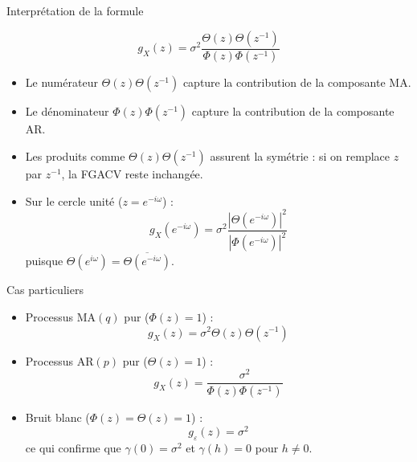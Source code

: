 \documentclass[11pt,aspectratio=169]{beamer}
\begin{document}
\begin{frame}{Interprétation de la formule}

\[
g_X(z) = \sigma^2 \frac{\Theta(z)\Theta(z^{-1})}{\Phi(z)\Phi(z^{-1})}
\]

\begin{itemize}

\item Le numérateur $\Theta(z)\Theta(z^{-1})$ capture la contribution de la composante MA.\newline

\item Le dénominateur $\Phi(z)\Phi(z^{-1})$ capture la contribution de la composante AR.\newline

\item Les produits comme $\Theta(z)\Theta(z^{-1})$ assurent la symétrie : si on remplace $z$ par $z^{-1}$, la FGACV reste inchangée.\newline

\item Sur le cercle unité ($z = e^{-i\omega}$) :
  \[
  g_X(e^{-i\omega}) = \sigma^2 \frac{|\Theta(e^{-i\omega})|^2}{|\Phi(e^{-i\omega})|^2}
  \]
  puisque $\Theta(e^{i\omega}) = \overline{\Theta(e^{-i\omega})}$.

\end{itemize}

\end{frame}

\begin{frame}{Cas particuliers}

\begin{itemize}

\item Processus MA$(q)$ pur ($\Phi(z) = 1$) :
  \[
  g_X(z) = \sigma^2 \Theta(z)\Theta(z^{-1})
  \]\newline

\item Processus AR$(p)$ pur ($\Theta(z) = 1$) :
  \[
  g_X(z) = \frac{\sigma^2}{\Phi(z)\Phi(z^{-1})}
  \]\newline

\item Bruit blanc ($\Phi(z) = \Theta(z) = 1$) :
  \[
  g_\varepsilon(z) = \sigma^2
  \]
  ce qui confirme que $\gamma(0) = \sigma^2$ et $\gamma(h) = 0$ pour $h \neq 0$.

\end{itemize}

\end{frame}
\end{document}
